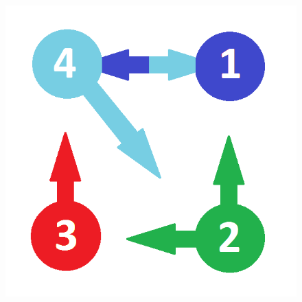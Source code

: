 \documentclass{beamer}
\begin{document}
\begin{frame}
\begin{figure}[!htb]
	\centering
	\includegraphics[scale=0.16]{figures/grafo}\\
\end{figure}	
	
\end{frame}
\end{document}
